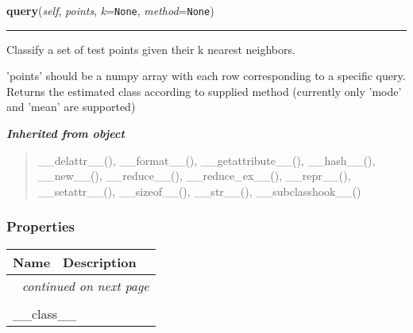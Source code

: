     \label{QSTK:qstklearn:kdtknn:kdtknn:query}

    \vspace{0.5ex}

\hspace{.8\funcindent}\begin{boxedminipage}{\funcwidth}

    \raggedright \textbf{query}(\textit{self}, \textit{points}, \textit{k}={\tt None}, \textit{method}={\tt None})

    \vspace{-1.5ex}

    \rule{\textwidth}{0.5\fboxrule}
\setlength{\parskip}{2ex}
    Classify a set of test points given their k nearest neighbors.

    'points' should be a numpy array with each row corresponding to a 
    specific query. Returns the estimated class according to supplied 
    method (currently only 'mode' and 'mean' are supported)

\setlength{\parskip}{1ex}
    \end{boxedminipage}


\large{\textbf{\textit{Inherited from object}}}

\begin{quote}
\_\_delattr\_\_(), \_\_format\_\_(), \_\_getattribute\_\_(), \_\_hash\_\_(), \_\_new\_\_(), \_\_reduce\_\_(), \_\_reduce\_ex\_\_(), \_\_repr\_\_(), \_\_setattr\_\_(), \_\_sizeof\_\_(), \_\_str\_\_(), \_\_subclasshook\_\_()
\end{quote}


  \subsubsection{Properties}

    \vspace{-1cm}
\hspace{\varindent}\begin{longtable}{|p{\varnamewidth}|p{\vardescrwidth}|l}
\cline{1-2}
\cline{1-2} \centering \textbf{Name} & \centering \textbf{Description}& \\
\cline{1-2}
\endhead\cline{1-2}\multicolumn{3}{r}{\small\textit{continued on next page}}\\\endfoot\cline{1-2}
\endlastfoot\multicolumn{2}{|l|}{\textit{Inherited from object}}\\
\multicolumn{2}{|p{\varwidth}|}{\raggedright \_\_class\_\_}\\
\cline{1-2}
\end{longtable}

